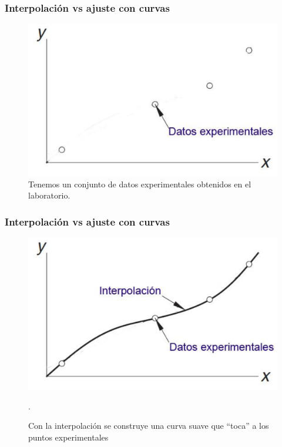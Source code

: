 \begin{frame}[fragile]
\frametitle{Interpolación vs ajuste con curvas}
\begin{figure}
\centering
\includegraphics[scale=0.55]{Imagenes/Interpol01.eps}
\caption{Tenemos un conjunto de datos experimentales obtenidos en el laboratorio.}
\end{figure}
\end{frame}
\begin{frame}[fragile]
\frametitle{Interpolación vs ajuste con curvas}
\begin{figure}
\centering
\includegraphics[scale=0.55]{Imagenes/Interpol02.eps}
\caption{Con la interpolación se construye una curva suave que \enquote{toca} a los puntos experimentales}.
\end{figure}
\end{frame}
